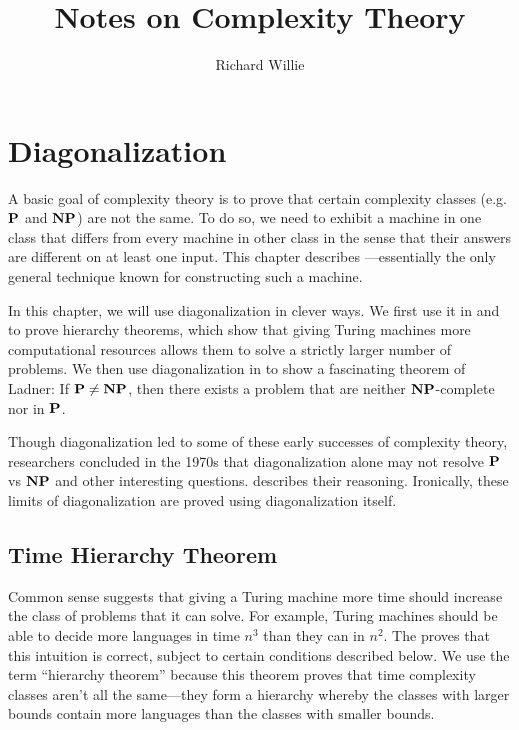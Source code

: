 \documentclass[11pt,twoside=off,numbers=noenddot]{scrbook}
\title{Notes on Complexity Theory}
\author{Richard Willie}
\begin{document}
\maketitle

\tableofcontents

\newpage

\chapter{Diagonalization}
A basic goal of complexity theory is to prove that certain complexity classes (e.g. $\textbf{P}$ and $\textbf{NP}$) are not the same. To do so, we need to exhibit a machine in one class that differs from every machine in other class in the sense that their answers are different on at least one input. This chapter describes —essentially the only general technique known for constructing such a machine.

In this chapter, we will use diagonalization in clever ways. We first use it in  and  to prove hierarchy theorems, which show that giving Turing machines more computational resources allows them to solve a strictly larger number of problems. We then use diagonalization in  to show a fascinating theorem of Ladner: If $\textbf{P} \neq \textbf{NP}$, then there exists a problem that are neither $\textbf{NP}$-complete nor in $\textbf{P}$.

Though diagonalization led to some of these early successes of complexity theory, researchers concluded in the 1970s that diagonalization alone may not resolve $\textbf{P}$ vs $\textbf{NP}$ and other interesting questions.  describes their reasoning. Ironically, these limits of diagonalization are proved using diagonalization itself.

\section{Time Hierarchy Theorem}
Common sense suggests that giving a Turing machine more time should increase the class of problems that it can solve. For example, Turing machines should be able to decide more languages in time $n^3$ than they can in $n^2$. The  proves that this intuition is correct, subject to certain conditions described below. We use the term ``hierarchy theorem'' because this theorem proves that time complexity classes aren't all the same—they form a hierarchy whereby the classes with larger bounds contain more languages than the classes with smaller bounds.
\end{document}
